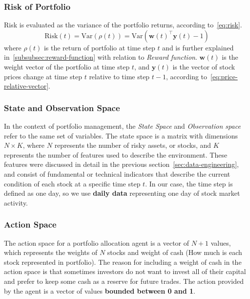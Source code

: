 \documentclass[../xlapes02]{subfiles}
\begin{document}

    \subsubsection{Risk of Portfolio}\label{subsubsec:risk-of-portfolio}
    Risk is evaluated as the variance of the portfolio returns, according to~\cref{eq:risk}.
    \begin{equation}
        \label{eq:risk}
        \text{Risk}(t)=\text{Var}(\rho(t))=\text{Var}(\bm{w}(t)^\top \bm{y}(t) - 1)
    \end{equation}
    where $\rho(t)$ is the return of portfolio at time step $t$ and is further explained in~\cref{subsubsec:reward-function} with relation to \emph{Reward function}. $\bm{w}(t)$ is the weight vector of the portfolio at time step $t$, and $\bm{y}(t)$ is the vector of stock prices change at time step $t$ relative to time step $t-1$, according to~\cref{eq:price-relative-vector}.


    \subsubsection{State and Observation Space}\label{subsubsec:state-space}
    In the context of portfolio management, the \emph{State Space} and \emph{Observation space} refer to the same set of variables. The state space is a matrix with dimensions $N\times K$, where $N$ represents the number of risky assets, or stocks, and $K$ represents the number of features used to describe the environment. These features were discussed in detail in the previous section~\cref{sec:data-engineering}, and consist of fundamental or technical indicators that describe the current condition of each stock at a specific time step $t$. In our case, the time step is defined as one day, so we use \textbf{daily data} representing one day of stock market activity.


    \subsubsection{Action Space}\label{subsubsec:action-space}
    The action space for a portfolio allocation agent is a vector of $N+1$ values, which represents the weights of $N$ stocks and weight of cash (How much is each stock represented in portfolio). The reason for including a weight of cash in the action space is that sometimes investors do not want to invest all of their capital and prefer to keep some cash as a reserve for future trades. The action provided by the agent is a vector of values \textbf{bounded between 0 and 1}.
\end{document}
